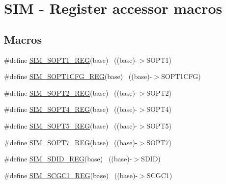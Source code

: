 \hypertarget{group___s_i_m___register___accessor___macros}{}\section{S\+IM -\/ Register accessor macros}
\label{group___s_i_m___register___accessor___macros}
\subsection*{Macros}
\begin{DoxyCompactItemize}
\item 
\#define \hyperlink{group___s_i_m___register___accessor___macros_ga4fb13e9e7e8bf019daf19284be9b0a73}{S\+I\+M\+\_\+\+S\+O\+P\+T1\+\_\+\+R\+EG}(base)                                        ~((base)-\/$>$S\+O\+P\+T1)
\item 
\#define \hyperlink{group___s_i_m___register___accessor___macros_ga2eac749528469c06ed7ac6d54070fdbd}{S\+I\+M\+\_\+\+S\+O\+P\+T1\+C\+F\+G\+\_\+\+R\+EG}(base)                                  ~((base)-\/$>$S\+O\+P\+T1\+C\+FG)
\item 
\#define \hyperlink{group___s_i_m___register___accessor___macros_ga94d1a56cbf8d6fbebbd00363ce3cd130}{S\+I\+M\+\_\+\+S\+O\+P\+T2\+\_\+\+R\+EG}(base)                                        ~((base)-\/$>$S\+O\+P\+T2)
\item 
\#define \hyperlink{group___s_i_m___register___accessor___macros_gae47c458103d1381ff7b7f25e45338a64}{S\+I\+M\+\_\+\+S\+O\+P\+T4\+\_\+\+R\+EG}(base)                                        ~((base)-\/$>$S\+O\+P\+T4)
\item 
\#define \hyperlink{group___s_i_m___register___accessor___macros_ga969ab1c02ed173435da69034770b467e}{S\+I\+M\+\_\+\+S\+O\+P\+T5\+\_\+\+R\+EG}(base)                                        ~((base)-\/$>$S\+O\+P\+T5)
\item 
\#define \hyperlink{group___s_i_m___register___accessor___macros_gadd45a86c03d150e9641a354840a71443}{S\+I\+M\+\_\+\+S\+O\+P\+T7\+\_\+\+R\+EG}(base)                                        ~((base)-\/$>$S\+O\+P\+T7)
\item 
\#define \hyperlink{group___s_i_m___register___accessor___macros_gad1b6e604a7db5ffcbe8c3e16d85c8e6b}{S\+I\+M\+\_\+\+S\+D\+I\+D\+\_\+\+R\+EG}(base)                                          ~((base)-\/$>$S\+D\+ID)
\item 
\#define \hyperlink{group___s_i_m___register___accessor___macros_ga5d7eb6d5c186d9fd66456b543145d886}{S\+I\+M\+\_\+\+S\+C\+G\+C1\+\_\+\+R\+EG}(base)                                        ~((base)-\/$>$S\+C\+G\+C1)

\end{DoxyCompactItemize}
